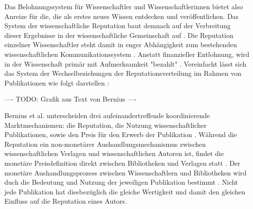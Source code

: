 Das Belohnungssystem für Wissenschaftler und Wissenschaftlerinnen bietet also Anreize für die, die als erstes neues Wissen entdecken und veröffentlichen. Das System der wissenschaftliche Reputation baut demnach auf der Verbreitung dieser Ergebnisse in der wissenschaftliche Gemeinschaft auf \cite{Fabrizio_2008}. Die Reputation einzelner Wissenschaftler steht damit in enger Abhängigkeit zum bestehenden wissenschaftlichen Kommunikationssystem \cite{suchen}. Anstatt finanzieller Entlohnung, wird in der Wissenschaft primär mit Aufmerksamkeit "bezahlt" \cite{suchen}. Vereinfacht lässt sich das System der Wechselbeziehungen der Reputationsverteilung im Rahmen von Publikationen wie folgt darstellen \cite{cite:21a}:

---- TODO: Grafik aus Text von Bernius ----

Bernius et al. unterscheiden drei aufeinandertreffende koordinierende Marktmechanismen: die Reputation, die Nutzung wissenschaftlicher Publikationen, sowie den Preis für den Erwerb der Publikation \cite{suchen}. Während die Reputation ein non-monetärer Aushandlungsmechanismus zwischen wissenschaftlichen Verlagen und wissenschaftlichen Autoren ist, findet die monetäre Preisdefinition direkt zwischen Bibliotheken und Verlagen statt \cite{EuropeanCommission_sciencepub_2006}. Der monetäre Aushandlungsprozess zwischen Wissenschaftlern und Bibliotheken wird duch die Bedeutung und Nutzung der jeweiligen Publikation bestimmt \cite{cite:21a}. Nicht jede Publikation hat diesbezüglich die gleiche Wertigkeit \cite{suchen} und damit den gleichen Einfluss auf die Reputation eines Autors.

